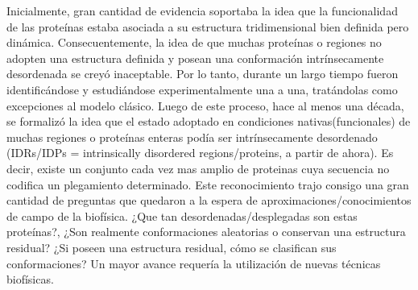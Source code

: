 Inicialmente, gran cantidad de evidencia soportaba la idea que la funcionalidad de las proteínas estaba asociada a su estructura tridimensional bien definida pero dinámica.
Consecuentemente, la idea de que muchas proteínas o regiones no adopten una estructura definida y posean una conformación intrínsecamente desordenada se creyó inaceptable. 
Por lo tanto, durante un largo tiempo fueron identificándose y estudiándose experimentalmente una a una, tratándolas como excepciones al modelo clásico.
Luego de este proceso, hace al menos una década, se formalizó la idea que el estado adoptado en condiciones nativas(funcionales) de muchas regiones o proteínas enteras podía ser intrínsecamente desordenado
(IDRs/IDPs = intrinsically disordered regions/proteins, a partir de ahora).
Es decir, existe un conjunto cada vez mas amplio de proteinas cuya secuencia no codifica un plegamiento determinado.
Este reconocimiento trajo consigo una gran cantidad de preguntas que quedaron a la espera de aproximaciones/conocimientos de campo de la biofísica.
¿Que tan desordenadas/desplegadas son estas proteínas?, ¿Son realmente conformaciones aleatorias o conservan una estructura residual?
¿Si poseen una estructura residual, cómo se clasifican sus conformaciones?
Un mayor avance requería la utilización de nuevas técnicas biofísicas\cite{eliezer2009biophysical}.



